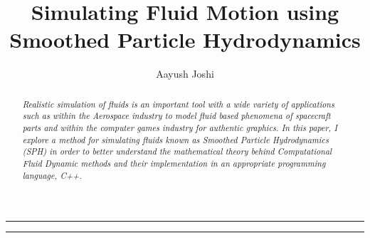 \documentclass[a4paper,11pt]{article}
\title{\textbf{Simulating Fluid Motion using Smoothed Particle Hydrodynamics}}
\author{Aayush Joshi}
\date{}
\begin{document}
\maketitle

\par\noindent\rule{\textwidth}{0.3pt}

\begin{abstract}
\noindent \textit{Realistic simulation of fluids is an important tool with a wide variety of applications such as within the Aerospace industry to model fluid based phenomena of spacecraft parts and within the computer games industry for authentic graphics. In this paper, I explore a method for simulating fluids known as Smoothed Particle Hydrodynamics (SPH) in order to better understand the mathematical theory behind Computational Fluid Dynamic methods and their implementation in an appropriate programming language, C++.}
\end{abstract}

\par\noindent\rule{\textwidth}{0.3pt}
\tableofcontents
\newpage
\begin{multicols}{2}

\pagebreak

\pagebreak

\pagebreak
\end{multicols}

\pagebreak

\pagebreak

\newpage
\begin{multicols}{2}
\nocite{*}

\end{multicols}

\end{document}
